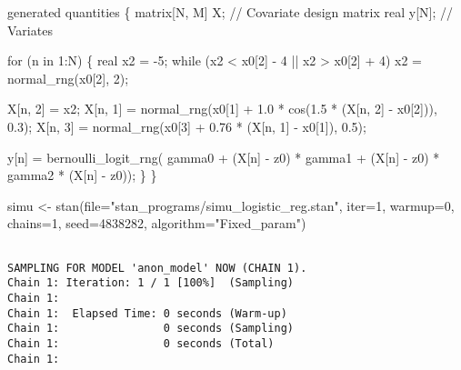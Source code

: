 \documentclass[
  letterpaper,
  DIV=11,
  numbers=noendperiod]{scrartcl}
\newenvironment{Shaded}{\begin{snugshade}}{\end{snugshade}}
\newcommand{\AttributeTok}[1]{\textcolor[rgb]{0.40,0.45,0.13}{#1}}
\newcommand{\CommentTok}[1]{\textcolor[rgb]{0.37,0.37,0.37}{#1}}
\newcommand{\ControlFlowTok}[1]{\textcolor[rgb]{0.00,0.23,0.31}{#1}}
\newcommand{\DataTypeTok}[1]{\textcolor[rgb]{0.68,0.00,0.00}{#1}}
\newcommand{\DecValTok}[1]{\textcolor[rgb]{0.68,0.00,0.00}{#1}}
\newcommand{\FloatTok}[1]{\textcolor[rgb]{0.68,0.00,0.00}{#1}}
\newcommand{\FunctionTok}[1]{\textcolor[rgb]{0.28,0.35,0.67}{#1}}
\newcommand{\KeywordTok}[1]{\textcolor[rgb]{0.00,0.23,0.31}{#1}}
\newcommand{\NormalTok}[1]{\textcolor[rgb]{0.00,0.23,0.31}{#1}}
\newcommand{\OtherTok}[1]{\textcolor[rgb]{0.00,0.23,0.31}{#1}}
\newcommand{\StringTok}[1]{\textcolor[rgb]{0.13,0.47,0.30}{#1}}
\begin{document}
\begin{codelisting}
\begin{Shaded}
\begin{Highlighting}[]
\KeywordTok{generated quantities}\NormalTok{ \{}
  \DataTypeTok{matrix}\NormalTok{[N, M] X; }\CommentTok{// Covariate design matrix}
  \DataTypeTok{real}\NormalTok{ y[N];      }\CommentTok{// Variates}

  \ControlFlowTok{for}\NormalTok{ (n }\ControlFlowTok{in} \DecValTok{1}\NormalTok{:N) \{}
    \DataTypeTok{real}\NormalTok{ x2 = {-}}\DecValTok{5}\NormalTok{;}
    \ControlFlowTok{while}\NormalTok{ (x2 \textless{} x0[}\DecValTok{2}\NormalTok{] {-} }\DecValTok{4}\NormalTok{ || x2 \textgreater{} x0[}\DecValTok{2}\NormalTok{] + }\DecValTok{4}\NormalTok{)}
\NormalTok{      x2 = normal\_rng(x0[}\DecValTok{2}\NormalTok{], }\DecValTok{2}\NormalTok{);}
    
\NormalTok{    X[n, }\DecValTok{2}\NormalTok{] = x2;}
\NormalTok{    X[n, }\DecValTok{1}\NormalTok{] = normal\_rng(x0[}\DecValTok{1}\NormalTok{] + }\FloatTok{1.0}\NormalTok{ * cos(}\FloatTok{1.5}\NormalTok{ * (X[n, }\DecValTok{2}\NormalTok{] {-} x0[}\DecValTok{2}\NormalTok{])), }\FloatTok{0.3}\NormalTok{);}
\NormalTok{    X[n, }\DecValTok{3}\NormalTok{] = normal\_rng(x0[}\DecValTok{3}\NormalTok{] + }\FloatTok{0.76}\NormalTok{ * (X[n, }\DecValTok{1}\NormalTok{] {-} x0[}\DecValTok{1}\NormalTok{]), }\FloatTok{0.5}\NormalTok{);}

\NormalTok{    y[n] = bernoulli\_logit\_rng(  gamma0 }
\NormalTok{                               + (X[n] {-} z0\textquotesingle{}) * gamma1}
\NormalTok{                               + (X[n] {-} z0\textquotesingle{}) * gamma2 * (X[n] {-} z0\textquotesingle{})\textquotesingle{});}
\NormalTok{  \}}
\NormalTok{\}}
\end{Highlighting}
\end{Shaded}

\end{codelisting}

\begin{Shaded}
\begin{Highlighting}[]
\NormalTok{simu }\OtherTok{\textless{}{-}} \FunctionTok{stan}\NormalTok{(}\AttributeTok{file=}\StringTok{"stan\_programs/simu\_logistic\_reg.stan"}\NormalTok{,}
             \AttributeTok{iter=}\DecValTok{1}\NormalTok{, }\AttributeTok{warmup=}\DecValTok{0}\NormalTok{, }\AttributeTok{chains=}\DecValTok{1}\NormalTok{,}
             \AttributeTok{seed=}\DecValTok{4838282}\NormalTok{, }\AttributeTok{algorithm=}\StringTok{"Fixed\_param"}\NormalTok{)}
\end{Highlighting}
\end{Shaded}

\begin{verbatim}

SAMPLING FOR MODEL 'anon_model' NOW (CHAIN 1).
Chain 1: Iteration: 1 / 1 [100%]  (Sampling)
Chain 1: 
Chain 1:  Elapsed Time: 0 seconds (Warm-up)
Chain 1:                0 seconds (Sampling)
Chain 1:                0 seconds (Total)
Chain 1: 
\end{verbatim}
\end{document}
